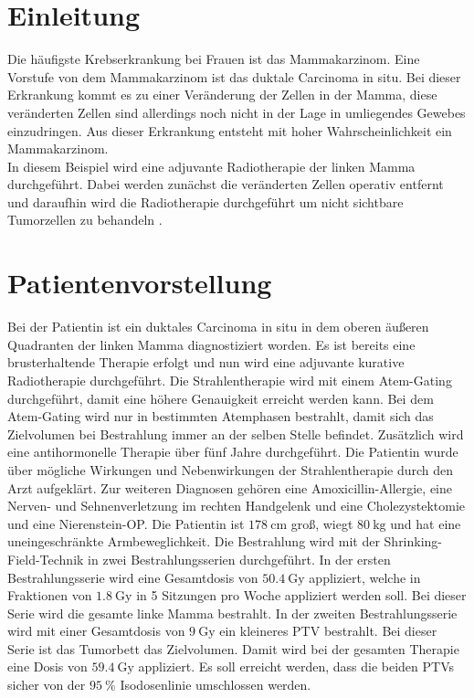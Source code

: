 \section{Einleitung}
\label{sec:Einleitung}
Die häufigste Krebserkrankung bei Frauen ist das Mammakarzinom. Eine Vorstufe von
dem Mammakarzinom ist das duktale Carcinoma in situ. Bei dieser Erkrankung kommt es zu einer Veränderung der
Zellen in der Mamma, diese veränderten Zellen sind allerdings noch nicht in der Lage in umliegendes Gewebes einzudringen.
Aus dieser Erkrankung entsteht mit hoher Wahrscheinlichkeit ein Mammakarzinom. \cite{Mamma} \\
In diesem Beispiel wird eine adjuvante Radiotherapie der linken Mamma durchgeführt. Dabei werden zunächst die veränderten
Zellen operativ entfernt und daraufhin wird die Radiotherapie durchgeführt um nicht sichtbare Tumorzellen zu behandeln \cite{adjuvant}.


\section{Patientenvorstellung}
\label{sec:Patientenvorstellung}
Bei der Patientin ist ein duktales Carcinoma in situ in dem oberen äußeren Quadranten der linken Mamma diagnostiziert worden.
Es ist bereits eine brusterhaltende Therapie erfolgt und nun wird eine adjuvante kurative Radiotherapie durchgeführt.
Die Strahlentherapie wird mit einem Atem-Gating durchgeführt, damit eine höhere Genauigkeit erreicht werden kann. Bei dem Atem-Gating wird nur in
bestimmten Atemphasen bestrahlt, damit sich das Zielvolumen bei Bestrahlung immer an der selben Stelle befindet.
Zusätzlich wird eine antihormonelle Therapie über fünf Jahre durchgeführt.
Die Patientin wurde über mögliche Wirkungen und Nebenwirkungen der Strahlentherapie durch den Arzt aufgeklärt.
Zur weiteren Diagnosen gehören eine Amoxicillin-Allergie, eine Nerven- und Sehnenverletzung im
rechten Handgelenk und eine Cholezystektomie und eine Nierenstein-OP.
Die Patientin ist $\SI{178}{\centi\meter}$ groß, wiegt $\SI{80}{\kilogram}$ und hat eine uneingeschränkte Armbeweglichkeit.
Die Bestrahlung wird mit der Shrinking-Field-Technik in zwei Bestrahlungsserien durchgeführt.
In der ersten Bestrahlungsserie wird eine Gesamtdosis von $\SI{50,4}{\gray}$ appliziert, welche in Fraktionen von $\SI{1,8}{\gray}$
in 5 Sitzungen pro Woche appliziert werden soll. Bei dieser Serie wird die gesamte linke Mamma bestrahlt.
In der zweiten Bestrahlungsserie wird mit einer Gesamtdosis von $\SI{9}{\gray}$ ein kleineres PTV bestrahlt.
Bei dieser Serie ist das Tumorbett das Zielvolumen. Damit wird bei der gesamten Therapie eine Dosis von $\SI{59,4}{\gray}$ appliziert.
Es soll erreicht werden, dass die beiden PTVs sicher von der $\SI{95}{\percent}$ Isodosenlinie umschlossen werden.
